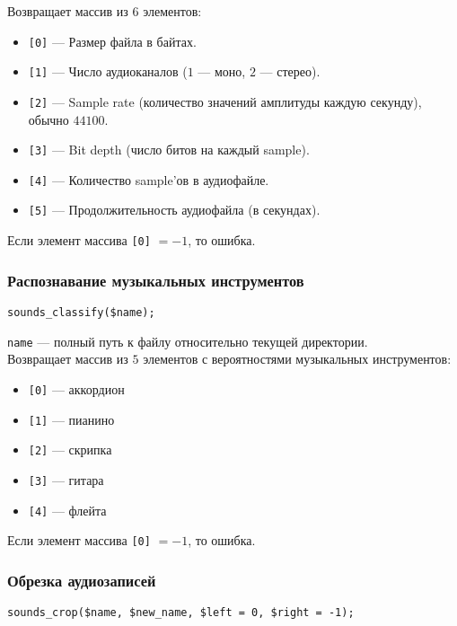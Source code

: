 \documentclass[14pt,a4paper]{article}
\begin{document}
\noindent Возвращает массив из $6$ элементов:
\smallskip 
\begin{itemize}
\item[] \lstinline{[0]} --- Размер файла в байтах.
\item[] \lstinline{[1]} --- Число аудиоканалов ($1$ --- моно, $2$ --- стерео).
\item[] \lstinline{[2]} --- Sample rate (количество значений амплитуды каждую секунду), обычно $44100$.
\item[] \lstinline{[3]} --- Bit depth (число битов на каждый sample).
\item[] \lstinline{[4]} --- Количество sample'ов в аудиофайле.
\item[] \lstinline{[5]} --- Продолжительность аудиофайла (в секундах).
\end{itemize}

\noindent Если элемент массива \lstinline{[0]} $= -1$, то ошибка.

\subsubsection*{Распознавание музыкальных инструментов}

\begin{lstlisting}
sounds_classify($name);
\end{lstlisting}

\lstinline{name} --- полный путь к файлу относительно текущей директории. \\

\noindent Возвращает массив из $5$ элементов с вероятностями музыкальных инструментов:
\smallskip 
\begin{itemize}
\item[] \lstinline{[0]} --- аккордион
\item[] \lstinline{[1]} --- пианино
\item[] \lstinline{[2]} --- скрипка
\item[] \lstinline{[3]} --- гитара
\item[] \lstinline{[4]} --- флейта
\end{itemize}

\noindent Если элемент массива \lstinline{[0]} $= -1$, то ошибка.

\subsubsection*{Обрезка аудиозаписей}

\begin{lstlisting}
sounds_crop($name, $new_name, $left = 0, $right = -1);
\end{lstlisting}
\end{document}
